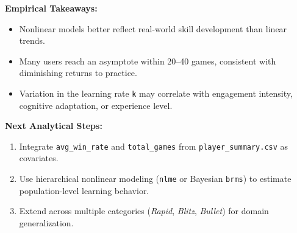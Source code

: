 \documentclass[
]{article}
\providecommand{\tightlist}{%
  \setlength{\itemsep}{0pt}\setlength{\parskip}{0pt}}
\begin{document}
\textbf{Empirical Takeaways:}

\begin{itemize}
\tightlist
\item
  Nonlinear models better reflect real-world skill development than
  linear trends.
\item
  Many users reach an asymptote within 20--40 games, consistent with
  diminishing returns to practice.
\item
  Variation in the learning rate \texttt{k} may correlate with
  engagement intensity, cognitive adaptation, or experience level.
\end{itemize}

\textbf{Next Analytical Steps:}

\begin{enumerate}
\def\labelenumi{\arabic{enumi}.}
\tightlist
\item
  Integrate \texttt{avg\_win\_rate} and \texttt{total\_games} from
  \texttt{player\_summary.csv} as covariates.
\item
  Use hierarchical nonlinear modeling (\texttt{nlme} or Bayesian
  \texttt{brms}) to estimate population-level learning behavior.
\item
  Extend across multiple categories (\emph{Rapid}, \emph{Blitz},
  \emph{Bullet}) for domain generalization.
\end{enumerate}
\end{document}
